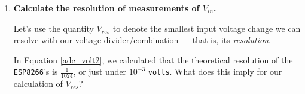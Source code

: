 \begin{enumerate}
	\item \textbf{Calculate the resolution of \adc measurements of $V_{in}$.}

	Let's use the quantity $V_{res}$ to denote the smallest input voltage change we can resolve with our voltage divider/\adc combination --- that is, its \emph{resolution}.

	\smallskip
	In Equation \ref{adc_volt2}, we calculated that the theoretical resolution of the \texttt{ESP8266}'s \adc is $\frac{1}{1024}$, or just under $10^{-3}$ \texttt{volts}.
	What does this imply for our calculation of  $V_{res}$?


\end{enumerate}
